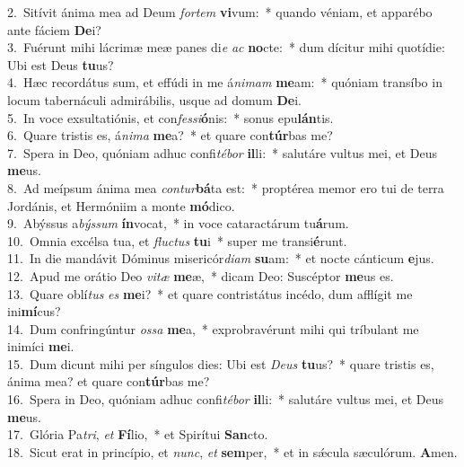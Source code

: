 {2.~}Sitívit ánima mea ad Deum \textit{for}\textit{tem} \textbf{vi}vum:~* quando véniam, et apparébo ante fáciem \textbf{De}i?\\
{3.~}Fuérunt mihi lácrimæ meæ panes di\textit{e} \textit{ac} \textbf{no}cte:~* dum dícitur mihi quotídie: Ubi est Deus \textbf{tu}us?\\
{4.~}Hæc recordátus sum, et effúdi in me á\textit{ni}\textit{mam} \textbf{me}am:~* quóniam transíbo in locum tabernáculi admirábilis, usque ad domum \textbf{De}i.\\
{5.~}In voce exsultatiónis, et con\textit{fes}\textit{si}\textbf{ó}nis:~* sonus epu\textbf{lán}tis.\\
{6.~}Quare tristis es, á\textit{ni}\textit{ma} \textbf{me}a?~* et quare con\textbf{túr}bas me?\\
{7.~}Spera in Deo, quóniam adhuc confi\textit{té}\textit{bor} \textbf{il}li:~* salutáre vultus mei, et Deus \textbf{me}us.\\
{8.~}Ad meípsum ánima mea \textit{con}\textit{tur}\textbf{bá}ta est:~* proptérea memor ero tui de terra Jordánis, et Hermóniim a monte \textbf{mó}dico.\\
{9.~}Abýssus a\textit{býs}\textit{sum} \textbf{ín}vocat,~* in voce cataractárum tu\textbf{á}rum.\\
{10.~}Omnia excélsa tua, et \textit{flu}\textit{ctus} \textbf{tu}i~* super me transi\textbf{é}runt.\\
{11.~}In die mandávit Dóminus misericór\textit{di}\textit{am} \textbf{su}am:~* et nocte cánticum \textbf{e}jus.\\
{12.~}Apud me orátio Deo \textit{vi}\textit{tæ} \textbf{me}æ,~* dicam Deo: Suscéptor \textbf{me}us es.\\
{13.~}Quare oblí\textit{tus} \textit{es} \textbf{me}i?~* et quare contristátus incédo, dum afflígit me ini\textbf{mí}cus?\\
{14.~}Dum confringúntur \textit{os}\textit{sa} \textbf{me}a,~* exprobravérunt mihi qui tríbulant me inimíci \textbf{me}i.\\
{15.~}Dum dicunt mihi per síngulos dies: Ubi est \textit{De}\textit{us} \textbf{tu}us?~* quare tristis es, ánima mea? et quare con\textbf{túr}bas me?\\
{16.~}Spera in Deo, quóniam adhuc confi\textit{té}\textit{bor} \textbf{il}li:~* salutáre vultus mei, et Deus \textbf{me}us.\\
{17.~}Glória Pa\textit{tri}, \textit{et} \textbf{Fí}lio,~* et Spirítui \textbf{San}cto.\\
{18.~}Sicut erat in princípio, et \textit{nunc}, \textit{et} \textbf{sem}per,~* et in sǽcula sæculórum. \textbf{A}men.\\
